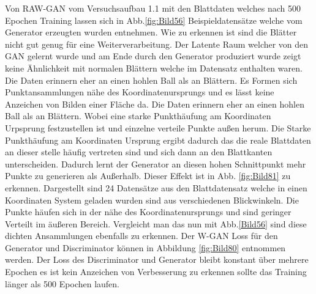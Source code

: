 \documentclass{llncs}
\begin{document}
Von RAW-GAN vom Versuchsaufbau 1.1 mit den Blattdaten welches nach 500 Epochen Training lassen sich in Abb.\ref{fig:Bild56} Beispieldatensätze welche vom Generator erzeugten wurden entnehmen. Wie zu erkennen ist sind die Blätter nicht gut genug für eine Weiterverarbeitung. Der Latente Raum welcher von den GAN gelernt wurde und am Ende durch den Generator produziert wurde zeigt keine Ähnlichkeit mit normalen Blättern welche im Datensatz enthalten waren. Die Daten erinnern eher an einen hohlen Ball als an Blättern. Es Formen sich Punktansammlungen nähe des Koordinatenursprungs und es lässt keine Anzeichen von Bilden einer Fläche da. Die Daten erinnern eher an einen hohlen Ball als an Blättern. Wobei eine starke Punkthäufung am Koordinaten Urpsprung festzustellen ist und einzelne verteile Punkte außen herum. Die Starke Punkthäufung am Koordinaten Ursprung ergibt dadurch das die reale Blattdaten an dieser stelle häufig vertreten sind und sich dann an den Blattkanten unterscheiden. Dadurch lernt der Generator an diesen hohen Schnittpunkt mehr Punkte zu generieren als Außerhalb. Dieser Effekt ist in Abb. \ref{fig:Bild81} zu erkennen. Dargestellt sind 24 Datensätze aus den Blattdatensatz welche in einen Koordinaten System geladen wurden sind aus verschiedenen Blickwinkeln. Die Punkte häufen sich in der nähe des Koordinatenursprungs und sind geringer Verteilt im äußeren Bereich. Vergleicht man das nun mit Abb.\ref{Bild56} sind diese dichten Ansammlungen ebenfalls zu erkennen. Der W-GAN Loss für den Generator und Discriminator können in Abbildung \ref{fig:Bild80} entnommen werden. Der Loss des Discriminator und Generator bleibt konstant über mehrere Epochen es ist kein Anzeichen von Verbesserung zu erkennen sollte das Training länger als 500 Epochen laufen. 
\end{document}
